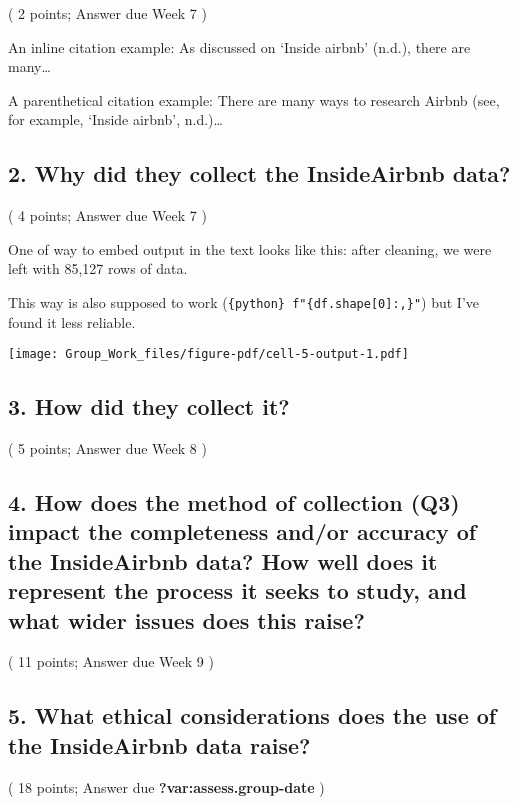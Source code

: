 \documentclass[
  a4paper,
  DIV=11,
  numbers=noendperiod]{scrartcl}
\begin{document}
( 2 points; Answer due Week 7 )

An inline citation example: As discussed on {`Inside airbnb'} (n.d.),
there are many\ldots{}

A parenthetical citation example: There are many ways to research Airbnb
(see, for example, {`Inside airbnb'}, n.d.)\ldots{}

\subsection{2. Why did they collect the InsideAirbnb
data?}\label{why-did-they-collect-the-insideairbnb-data}

( 4 points; Answer due Week 7 )

One of way to embed output in the text looks like this: after cleaning,
we were left with 85,127 rows of data.

This way is also supposed to work
(\texttt{\{python\}\ f"\{df.shape{[}0{]}:,\}"}) but I've found it less
reliable.

\texttt{[image: Group\_Work\_files/figure-pdf/cell-5-output-1.pdf]}

\subsection{3. How did they collect it?}\label{how-did-they-collect-it}

( 5 points; Answer due Week 8 )

\subsection{4. How does the method of collection (Q3) impact the
completeness and/or accuracy of the InsideAirbnb data? How well does it
represent the process it seeks to study, and what wider issues does this
raise?}\label{how-does-the-method-of-collection-q3-impact-the-completeness-andor-accuracy-of-the-insideairbnb-data-how-well-does-it-represent-the-process-it-seeks-to-study-and-what-wider-issues-does-this-raise}

( 11 points; Answer due Week 9 )

\subsection{5. What ethical considerations does the use of the
InsideAirbnb data
raise?}\label{what-ethical-considerations-does-the-use-of-the-insideairbnb-data-raise}

( 18 points; Answer due \textbf{?var:assess.group-date} )
\end{document}
